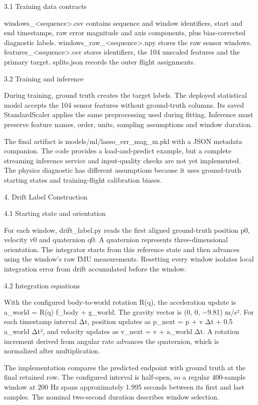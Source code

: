 \documentclass[
  11pt,
]{article}
\begin{document}
3.1 Training data contracts

windows\_\textless sequence\textgreater.csv contains sequence and window identifiers, start and end timestamps, raw error magnitude and axis components, plus bias-corrected diagnostic labels. windows\_raw\_\textless sequence\textgreater.npy stores the raw sensor windows. features\_\textless sequence\textgreater.csv stores identifiers, the 104 unscaled features and the primary target. splits.json records the outer flight assignments.

3.2 Training and inference

During training, ground truth creates the target labels. The deployed statistical model accepts the 104 sensor features without ground-truth columns. Its saved StandardScaler applies the same preprocessing used during fitting. Inference must preserve feature names, order, units, sampling assumptions and window duration.

The final artifact is models/ml/lasso\_err\_mag\_m.pkl with a JSON metadata companion. The code provides a load-and-predict example, but a complete streaming inference service and input-quality checks are not yet implemented. The physics diagnostic has different assumptions because it uses ground-truth starting states and training-flight calibration biases.

4. Drift Label Construction

4.1 Starting state and orientation

For each window, drift\_label.py reads the first aligned ground-truth position p0, velocity v0 and quaternion q0. A quaternion represents three-dimensional orientation. The integrator starts from this reference state and then advances using the window's raw IMU measurements. Resetting every window isolates local integration error from drift accumulated before the window.

4.2 Integration equations

With the configured body-to-world rotation R(q), the acceleration update is a\_world = R(q) f\_body + g\_world. The gravity vector is (0, 0, −9.81) m/s². For each timestamp interval Δt, position updates as p\_next = p + v Δt + 0.5 a\_world Δt², and velocity updates as v\_next = v + a\_world Δt. A rotation increment derived from angular rate advances the quaternion, which is normalized after multiplication.

The implementation compares the predicted endpoint with ground truth at the final retained row. The configured interval is half-open, so a regular 400-sample window at 200 Hz spans approximately 1.995 seconds between its first and last samples. The nominal two-second duration describes window selection.
\end{document}

